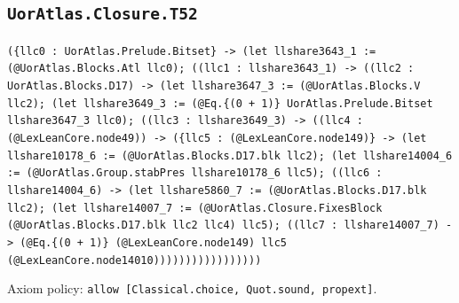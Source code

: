 \documentclass[11pt]{article}
\begin{document}
\subsection*{\texttt{UorAtlas.Closure.T52}}
\noindent\texttt{(\{llc0 : UorAtlas.Prelude.Bitset\} -> (let llshare3643\_1 := (@UorAtlas.Blocks.Atl llc0); ((llc1 : llshare3643\_1) -> ((llc2 : UorAtlas.Blocks.D17) -> (let llshare3647\_3 := (@UorAtlas.Blocks.V llc2); (let llshare3649\_3 := (@Eq.\{(0 + 1)\} UorAtlas.Prelude.Bitset llshare3647\_3 llc0); ((llc3 : llshare3649\_3) -> ((llc4 : (@LexLeanCore.node49)) -> (\{llc5 : (@LexLeanCore.node149)\} -> (let llshare10178\_6 := (@UorAtlas.Blocks.D17.blk llc2); (let llshare14004\_6 := (@UorAtlas.Group.stabPres llshare10178\_6 llc5); ((llc6 : llshare14004\_6) -> (let llshare5860\_7 := (@UorAtlas.Blocks.D17.blk llc2); (let llshare14007\_7 := (@UorAtlas.Closure.FixesBlock (@UorAtlas.Blocks.D17.blk llc2 llc4) llc5); ((llc7 : llshare14007\_7) -> (@Eq.\{(0 + 1)\} (@LexLeanCore.node149) llc5 (@LexLeanCore.node14010)))))))))))))))))}\par
\noindent Axiom policy: \texttt{allow [Classical.choice, Quot.sound, propext]}.\par
\end{document}
